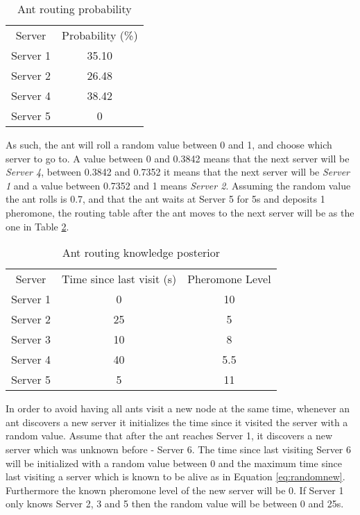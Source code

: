 \documentclass[conference]{IEEEtran}
\begin{document}
\begin{table}
\centering
\begin{tabular}{c|c}
Server & Probability (\%) \\
Server 1 & 35.10 \\
Server 2 & 26.48 \\
Server 4 & 38.42 \\
Server 5 & 0 \\
\end{tabular}
\caption{Ant routing probability}
\label{tab:ant_prob}
\end{table}

As such, the ant will roll a random value between 0 and 1, and choose which server to go to. A value between 0 and 0.3842 means that the next server will be \textit{Server 4}, between 0.3842 and 0.7352 it means that the next server will be \textit{Server 1} and a value between 0.7352 and 1 means \textit{Server 2}. Assuming the random value the ant rolls is 0.7, and that the ant waits at Server 5 for 5s and deposits 1 pheromone, the routing table after the ant moves to the next server will be as the one in Table \ref{tab:ant_post}.

\begin{table}
\centering
\begin{tabular}{c|c|c}
Server & Time since last visit (s) & Pheromone Level \\
Server 1 & 0 & 10 \\
Server 2 & 25 & 5 \\
Server 3 & 10 & 8 \\
Server 4 & 40 & 5.5 \\
Server 5 & 5 & 11 \\
\end{tabular}
\caption{Ant routing knowledge posterior}
\label{tab:ant_post}
\end{table}

In order to avoid having all ants visit a new node at the same time, whenever an ant discovers a new server it initializes the time since it visited the server with a random value. Assume that after the ant reaches Server 1, it discovers a new server which was unknown before - Server 6. The time since last visiting Server 6 will be initialized with a random value between 0 and the maximum time since last visiting a server which is known to be alive as in Equation \ref{eq:randomnew}. Furthermore the known pheromone level of the new server will be 0. If Server 1 only knows Server 2, 3 and 5 then the random value will be between 0 and 25s.
\end{document}
